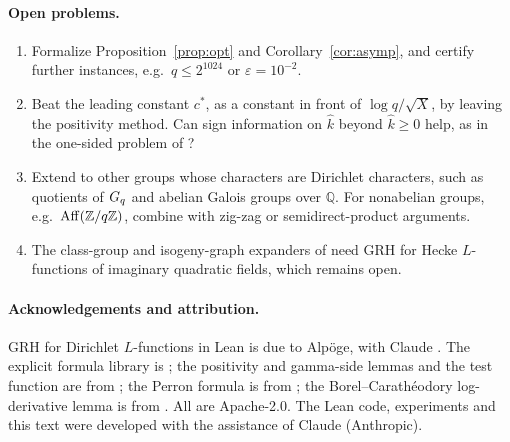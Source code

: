 \paragraph{Open problems.}
\begin{enumerate}[leftmargin=2em]
\item Formalize Proposition~\ref{prop:opt} and Corollary~\ref{cor:asymp}, and certify further instances,
  e.g.\ $q\le2^{1024}$ or $\varepsilon=10^{-2}$.
\item Beat the leading constant $c^*$, as a constant in front of $\log q/\sqrt X$, by leaving the positivity
  method. Can sign information on $\hat k$ beyond $\hat k\ge0$ help, as in the one-sided problem of \cite{cmqr2024}?
\item Extend to other groups whose characters are Dirichlet characters, such as quotients of $G_q$ and abelian
  Galois groups over $\mathbb Q$. For nonabelian groups, e.g.\ $\mathrm{Aff}(\mathbb{Z}/q\mathbb{Z})$, combine with zig-zag or
  semidirect-product arguments.
\item The class-group and isogeny-graph expanders of \cite{jmv2009} need GRH for Hecke $L$-functions of
  imaginary quadratic fields, which remains open.
\end{enumerate}

\paragraph{Acknowledgements and attribution.}
GRH for Dirichlet $L$-functions in Lean is due to Alpöge, with Claude \cite{alpoge2026,grhlean}. The explicit
formula library is \cite{zeta23}; the positivity and gamma-side lemmas and the test function are from
\cite{grhmiller}; the Perron formula is from \cite{schoenfeldlean}; the Borel--Carath\'eodory log-derivative
lemma is from \cite{rhprimeerror}. All are Apache-2.0. The Lean code, experiments and this text were developed
with the assistance of Claude (Anthropic).
